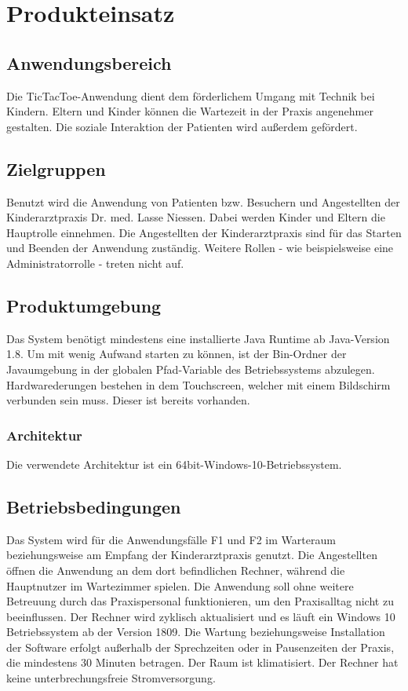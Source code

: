 \documentclass[12pt]{article}
\begin{document}
\section{Produkteinsatz}
\subsection{Anwendungsbereich}
Die \Gls{TicTacToe}-Anwendung dient dem förderlichem Umgang mit Technik bei Kindern. Eltern und Kinder können die Wartezeit in der Praxis angenehmer gestalten. Die soziale Interaktion der Patienten wird außerdem gefördert.
\subsection{Zielgruppen}
Benutzt wird die Anwendung von Patienten bzw. Besuchern und Angestellten der Kinderarztpraxis Dr. med. Lasse Niessen. Dabei werden Kinder und Eltern die Hauptrolle einnehmen. Die Angestellten der Kinderarztpraxis sind für das Starten und Beenden der Anwendung zuständig. Weitere Rollen - wie beispielsweise eine Administratorrolle - treten nicht auf.
\subsection{Produktumgebung}
Das System benötigt mindestens eine installierte Java Runtime ab Java-Version 1.8. Um mit wenig Aufwand starten zu können, ist der Bin-Ordner der Javaumgebung in der globalen Pfad-Variable des Betriebssystems abzulegen.
Hardwarederungen bestehen in dem Touchscreen, welcher mit einem Bildschirm verbunden sein muss. Dieser ist bereits vorhanden.
\subsubsection{Architektur}
Die verwendete Architektur ist ein 64bit-Windows-10-Betriebssystem.
\subsection{Betriebsbedingungen}
Das System wird für die Anwendungsfälle F1 und F2 im Warteraum beziehungsweise am Empfang der Kinderarztpraxis genutzt. Die Angestellten öffnen die Anwendung an dem dort befindlichen Rechner, während die Hauptnutzer im Wartezimmer spielen. Die Anwendung soll ohne weitere Betreuung durch das Praxispersonal funktionieren, um den Praxisalltag nicht zu beeinflussen. Der Rechner wird zyklisch aktualisiert und es läuft ein Windows 10 Betriebssystem ab der Version 1809. Die Wartung beziehungsweise Installation der Software erfolgt außerhalb der Sprechzeiten oder in Pausenzeiten der Praxis, die mindestens 30 Minuten betragen. Der Raum ist klimatisiert. Der Rechner hat keine unterbrechungsfreie Stromversorgung.
\end{document}
